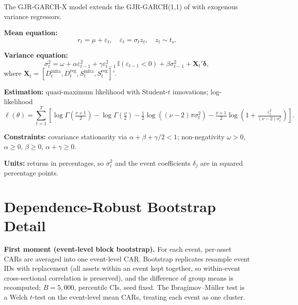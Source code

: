 \documentclass[pdflatex,sn-mathphys-num]{sn-jnl}
\theoremstyle{thmstyleone}
\theoremstyle{thmstyletwo}
\theoremstyle{thmstylethree}
\begin{document}
\begin{appendices}
The GJR-GARCH-X model extends the GJR-GARCH(1,1) of \citet{GlostenEtAl1993} with exogenous variance regressors.

\textbf{Mean equation:}
\begin{equation}
r_t = \mu + \varepsilon_t, \quad \varepsilon_t = \sigma_t z_t, \quad z_t \sim t_\nu.
\end{equation}

\textbf{Variance equation:}
\begin{equation}
\sigma^2_t = \omega + \alpha \varepsilon^2_{t-1} + \gamma \varepsilon^2_{t-1}\,\mathbb{I}(\varepsilon_{t-1}<0) + \beta \sigma^2_{t-1} + \mathbf{X}_t' \boldsymbol{\delta},
\end{equation}
where $\mathbf{X}_t = [D^{\text{infra}}_t, D^{\text{reg}}_t, S^{\text{infra}}_t, S^{\text{reg}}_t]'$.

\textbf{Estimation:} quasi-maximum likelihood with Student-$t$ innovations; log-likelihood
\begin{equation}
\ell(\theta) = \sum_{t=1}^{T} \left[ \log \Gamma\!\left(\tfrac{\nu+1}{2}\right) - \log \Gamma\!\left(\tfrac{\nu}{2}\right) - \tfrac{1}{2}\log((\nu-2)\pi\sigma^2_t) - \tfrac{\nu+1}{2}\log\!\left(1 + \tfrac{\varepsilon^2_t}{(\nu-2)\sigma^2_t}\right) \right].
\end{equation}

\textbf{Constraints:} covariance stationarity via $\alpha+\beta+\gamma/2<1$; non-negativity $\omega>0$, $\alpha\geq 0$, $\beta\geq 0$, $\alpha+\gamma\geq 0$.

\textbf{Units:} returns in percentages, so $\sigma^2_t$ and the event coefficients $\delta_j$ are in squared percentage points.

\section{Dependence-Robust Bootstrap Detail}\label{app:bootstrap}

\textbf{First moment (event-level block bootstrap).} For each event, per-asset CARs are averaged into one event-level CAR. Bootstrap replicates resample event IDs with replacement (all assets within an event kept together, so within-event cross-sectional correlation is preserved), and the difference of group means is recomputed; $B=5{,}000$, percentile CIs, seed fixed. The Ibragimov--M\"uller test is a Welch $t$-test on the event-level mean CARs, treating each event as one cluster.


\end{appendices}
\end{document}
